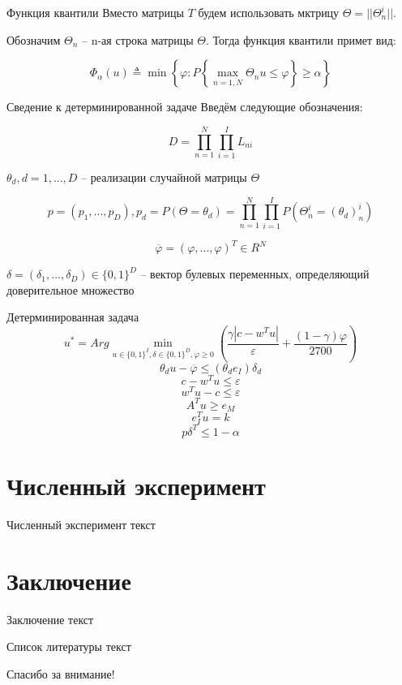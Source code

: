 \documentclass[aspectratio=169]{beamer}
\begin{document}
    \begin{frame}{Функция квантили}
        Вместо матрицы $T$ будем использовать мктрицу $\Theta=||\Theta_n^i||$.
        
        Обозначим $\Theta_n$ -- n-ая строка матрицы $\Theta$. Тогда функция квантили примет вид:
        
        $$\Phi_\alpha(u)\triangleq\min\left\{\varphi:P\left\{\max_{n=\overline{1,N}}\Theta_n u\leq\varphi\right\}\geq\alpha\right\}$$
    \end{frame}
    
    \begin{frame}{Сведение к детерминированной задаче}
        Введём следующие обозначения:
        
        $$D=\prod_{n=1}^N\prod_{i=1}^I L_{ni}$$
        
        $\theta_d, d=1,...,D$ -- реализации случайной матрицы $\Theta$
        
        $$p=(p_1,...,p_D), p_d = P(\Theta=\theta_d)=\prod_{n=1}^N\prod_{i=1}^I P(\Theta_n^i=(\theta_d)_n^i)$$
        
        $$\overline{\varphi}=(\varphi,...,\varphi)^T\in R^N$$
        
        $\delta=(\delta_1,...,\delta_D)\in\{0,1\}^D$ -- вектор булевых переменных, определяющий доверительное множество
    \end{frame}
    
    \begin{frame}{Детерминированная задача}
        $$u^* = Arg\min_{u\in\{0, 1\}^I, \delta\in\{0, 1\}^D, \varphi\geq 0}\left(\frac{\gamma\left|c-w^T u\right|}{\varepsilon} + \frac{(1-\gamma)\varphi}{2700}\right)$$
        $$\theta_d u - \overline{\varphi}\leq(\theta_d e_I)\delta_d$$
        $$c-w^T u\leq\varepsilon$$
        $$w^T u-c\leq\varepsilon$$
        $$A^T u\geq e_M$$
        $$e_I^T u=k$$
        $$p\delta^T \leq 1-\alpha$$
    \end{frame}


    \section{Численный эксперимент}
    \begin{frame}{Численный эксперимент}
        текст\\
    \end{frame}

    \section{Заключение}
    \begin{frame}{Заключение}
        текст\\
    \end{frame}
    
    \begin{frame}{Список литературы}
        текст\\
    \end{frame}

    \begin{frame}
        \centering
        \huge
        Спасибо за внимание!\\
    \end{frame}
\end{document}

